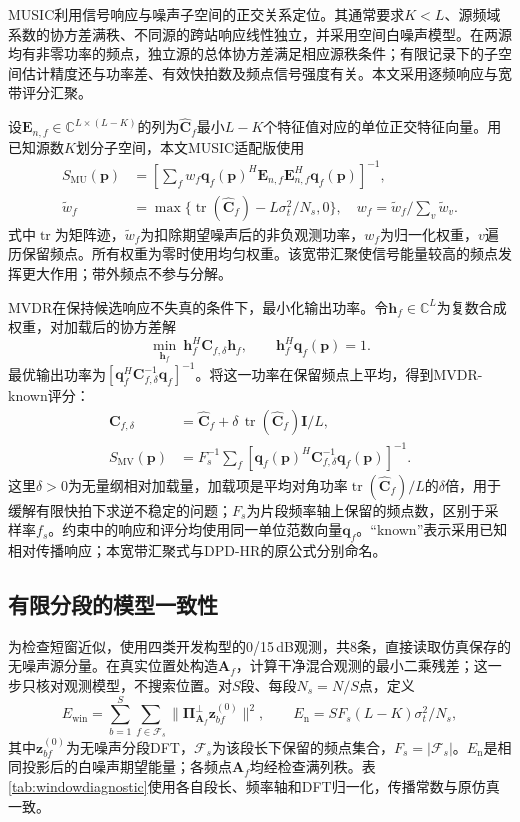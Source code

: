 \documentclass[a4paper,fleqn]{cas-sc}
\numberwithin{equation}{section}
\numberwithin{figure}{section}
\numberwithin{table}{section}
\newcommand{\C}{\mathbb C}
\newcommand{\tr}{\operatorname{tr}}
\begin{document}
MUSIC利用信号响应与噪声子空间的正交关系定位\cite{WeissAmar2005}。其通常要求$K<L$、源频域系数的协方差满秩、不同源的跨站响应线性独立，并采用空间白噪声模型。在两源均有非零功率的频点，独立源的总体协方差满足相应源秩条件；有限记录下的子空间估计精度还与功率差、有效快拍数及频点信号强度有关。本文采用逐频响应与宽带评分汇聚。

设$\bm E_{n,f}\in\C^{L\times(L-K)}$的列为$\widehat{\bm C}_f$最小$L-K$个特征值对应的单位正交特征向量。用已知源数$K$划分子空间，本文MUSIC适配版使用
\begin{align}
 S_{\mathrm{MU}}(\bm p)&=\left[\sum_f w_f
 \bm q_f(\bm p)^H\bm E_{n,f}\bm E_{n,f}^H\bm q_f(\bm p)\right]^{-1},\label{eq:music}\\
 \widetilde w_f&=\max\{\tr(\widehat{\bm C}_f)-L\sigma_t^2/N_s,0\},\quad
 w_f=\widetilde w_f/\sum_v\widetilde w_v .\nonumber
\end{align}
式中$\tr$为矩阵迹，$\widetilde w_f$为扣除期望噪声后的非负观测功率，$w_f$为归一化权重，$v$遍历保留频点。所有权重为零时使用均匀权重。该宽带汇聚使信号能量较高的频点发挥更大作用；带外频点不参与分解。

MVDR在保持候选响应不失真的条件下，最小化输出功率\cite{Capon1969}。令$\bm h_f\in\C^L$为复数合成权重，对加载后的协方差解
\begin{equation}
 \min_{\bm h_f}\ \bm h_f^H\bm C_{f,\delta}\bm h_f,
 \qquad \bm h_f^H\bm q_f(\bm p)=1.\label{eq:mvdrConstraint}
\end{equation}
最优输出功率为$[\bm q_f^H\bm C_{f,\delta}^{-1}\bm q_f]^{-1}$。将这一功率在保留频点上平均，得到MVDR-known评分：
\begin{align}
 \bm C_{f,\delta}&=\widehat{\bm C}_f+
 \delta\,\tr(\widehat{\bm C}_f)\bm I/L,\nonumber\\
 S_{\mathrm{MV}}(\bm p)&=F_s^{-1}\sum_f
 [\bm q_f(\bm p)^H\bm C_{f,\delta}^{-1}\bm q_f(\bm p)]^{-1} .\label{eq:mvdr}
\end{align}
这里$\delta>0$为无量纲相对加载量，加载项是平均对角功率$\tr(\widehat{\bm C}_f)/L$的$\delta$倍，用于缓解有限快拍下求逆不稳定的问题；$F_s$为片段频率轴上保留的频点数，区别于采样率$f_s$。约束中的响应和评分均使用同一单位范数向量$\bm q_f$。“known”表示采用已知相对传播响应；本宽带汇聚式与DPD-HR的原公式分别命名\cite{TirerWeiss2016}。

\subsection{有限分段的模型一致性}\label{app:segmentcheck}
为检查短窗近似，使用四类开发构型的0/15\,dB观测，共8条，直接读取仿真保存的无噪声源分量。在真实位置处构造$\bm A_f$，计算干净混合观测的最小二乘残差；这一步只核对观测模型，不搜索位置。对$S$段、每段$N_s=N/S$点，定义
\begin{equation}
 E_{\mathrm{win}}=\sum_{b=1}^{S}\sum_{f\in\mathcal F_s}
 \|\bm\Pi_{\bm A_f}^{\perp}\bm z_{bf}^{(0)}\|^2,\qquad
 E_{\mathrm n}=SF_s(L-K)\sigma_t^2/N_s ,
 \label{eq:windowdiagnostic}
\end{equation}
其中$\bm z_{bf}^{(0)}$为无噪声分段DFT，$\mathcal F_s$为该段长下保留的频点集合，$F_s=|\mathcal F_s|$。$E_{\mathrm n}$是相同投影后的白噪声期望能量；各频点$\bm A_f$均经检查满列秩。表\ref{tab:windowdiagnostic}使用各自段长、频率轴和DFT归一化，传播常数与原仿真一致。
\end{document}
